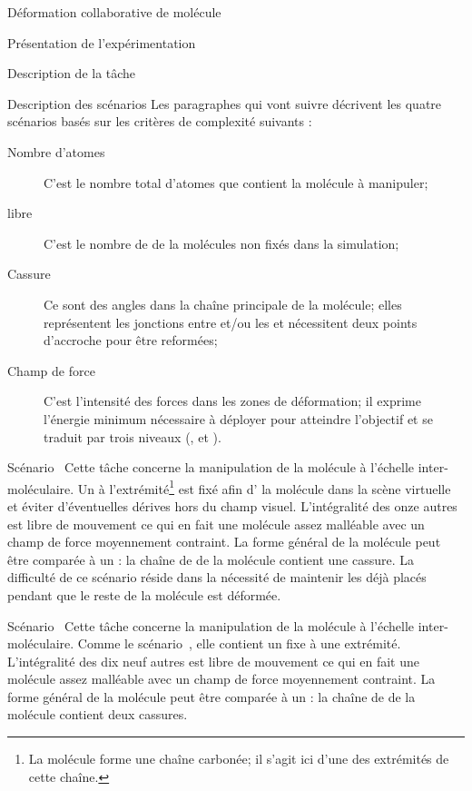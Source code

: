 \documentclass[myfrancais,ngerman,english,frenchb]{mythesis}
\begin{document}
\begin{mychapter}{Déformation collaborative de molécule}
\begin{mysection}{Présentation de l'expérimentation}
\begin{mysubsection}{Description de la tâche}
\begin{mysubsubsection}{Description des scénarios}
					Les paragraphes qui vont suivre décrivent les quatre scénarios basés sur les critères de complexité suivants :
					\begin{description}
						\item[Nombre d'atomes] C'est le nombre total d'atomes que contient la molécule à manipuler;
						\item[ libre] C'est le nombre de  de la molécules non fixés dans la simulation;
						\item[Cassure] Ce sont des angles dans la chaîne principale de la molécule; elles représentent les jonctions entre \myhelice* et/ou les \myfeuillet* et nécessitent deux points d'accroche pour être reformées;
						\item[Champ de force] C'est l'intensité des forces dans les zones de déformation; il exprime l'énergie minimum nécessaire à déployer pour atteindre l'objectif et se traduit par trois niveaux (,  et ).
					\end{description}
					\begin{myparagraph}{Scénario~}
						Cette tâche concerne la manipulation de la molécule \myTRPZIPPER à l'échelle inter-moléculaire.
						Un  à l'extrémité\footnote{La molécule forme une chaîne carbonée; il s'agit ici d'une des extrémités de cette chaîne.} est fixé afin d' la molécule dans la scène virtuelle et éviter d'éventuelles dérives hors du champ visuel.
						L'intégralité des onze autres  est libre de mouvement ce qui en fait une molécule assez malléable avec un champ de force moyennement contraint.
						La forme général de la molécule peut être comparée à un  : la chaîne de  de la molécule contient une cassure.
						La difficulté de ce scénario réside dans la nécessité de maintenir les  déjà placés pendant que le reste de la molécule est déformée.
					\end{myparagraph}
					\begin{myparagraph}{Scénario~}
						Cette tâche concerne la manipulation de la molécule \myTRPCAGE à l'échelle inter-moléculaire.
						Comme le scénario~, elle contient un  fixe à une extrémité.
						L'intégralité des dix neuf autres  est libre de mouvement ce qui en fait une molécule assez malléable avec un champ de force moyennement contraint.
						La forme général de la molécule peut être comparée à un  : la chaîne de  de la molécule contient deux cassures.

\end{myparagraph}
\end{mysubsubsection}
\end{mysubsection}
\end{mysection}
\end{mychapter}
\end{document}
